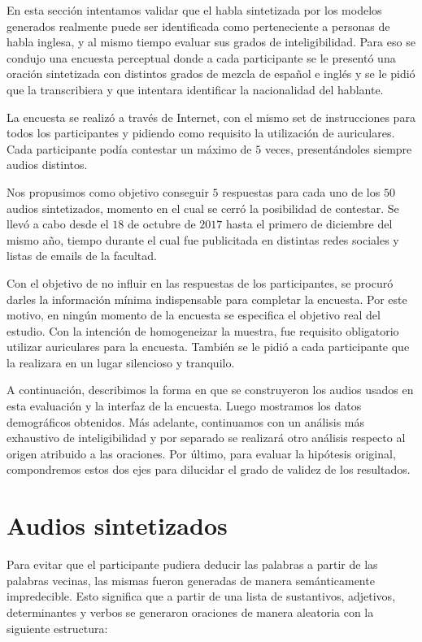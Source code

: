 
En esta sección intentamos validar que el habla sintetizada por los modelos generados realmente puede ser identificada como perteneciente a personas de habla inglesa, y al mismo tiempo evaluar sus grados de inteligibilidad. Para eso se condujo una encuesta perceptual donde a cada participante se le presentó una oración sintetizada con distintos grados de mezcla de español e inglés y se le pidió que la transcribiera y que intentara identificar la nacionalidad del hablante. 

La encuesta se realizó a través de Internet, con el mismo set de instrucciones para todos los participantes y pidiendo como requisito la utilización de auriculares. Cada participante podía contestar un máximo de $5$ veces, presentándoles siempre audios distintos.

Nos propusimos como objetivo conseguir $5$ respuestas para cada uno de los $50$ audios sintetizados, momento en el cual se cerró la posibilidad de contestar. Se llevó a cabo desde el $18$ de octubre de $2017$ hasta el primero de diciembre del mismo año, tiempo durante el cual fue publicitada en distintas redes sociales y listas de emails de la facultad.

Con el objetivo de no influir en las respuestas de los participantes, se procuró darles la información mínima indispensable para completar la encuesta. Por este motivo, en ningún momento de la encuesta se especifica el objetivo real del estudio. Con la intención de homogeneizar la muestra, fue requisito obligatorio utilizar auriculares para la encuesta. También se le pidió a cada participante que la realizara en un lugar silencioso y tranquilo.

A continuación, describimos la forma en que se construyeron los audios usados en esta evaluación y la interfaz de la encuesta. Luego mostramos los datos demográficos  obtenidos. Más adelante, continuamos con un análisis más exhaustivo de inteligibilidad y por separado se realizará otro análisis respecto al origen atribuido a las oraciones.
Por último, para evaluar la hipótesis original, compondremos estos dos ejes para dilucidar el grado de validez de los resultados.

\section{Audios sintetizados}

Para evitar que el participante pudiera deducir las palabras a partir de las palabras vecinas, las mismas fueron generadas de manera semánticamente impredecible. Esto significa que a partir de una lista de sustantivos, adjetivos, determinantes y verbos se generaron oraciones de manera aleatoria con la siguiente estructura:

